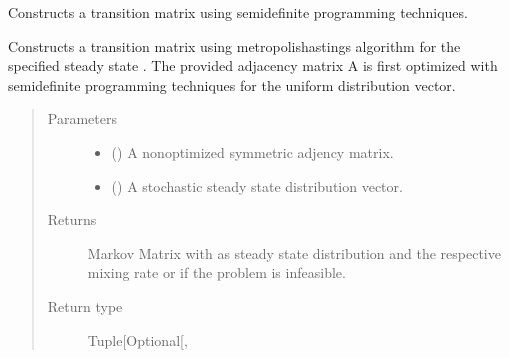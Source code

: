 \documentclass[letterpaper,10pt,english]{sphinxmanual}
\begin{document}

\begin{fulllineitems}
\label{\detokenize{app.domain.helpers:app.domain.helpers.matrices.new_sdp_mh_transition_matrix}}
Constructs a transition matrix using semi\sphinxhyphen{}definite programming techniques.

Constructs a transition matrix using metropolis\sphinxhyphen{}hastings algorithm  for
the specified steady state . The provided adjacency matrix A is first
optimized with semi\sphinxhyphen{}definite programming techniques for the uniform
distribution vector.
\begin{quote}\begin{description}
\item[{Parameters}] \leavevmode\begin{itemize}
\item {} 
 () \textendash{} A non\sphinxhyphen{}optimized symmetric adjency matrix.

\item {} 
 () \textendash{} A stochastic steady state distribution vector.

\end{itemize}

\item[{Returns}] \leavevmode
Markov Matrix with  as steady state distribution and the
respective mixing rate or  if the problem is
infeasible.

\item[{Return type}] \leavevmode
Tuple{[}Optional{[}\sphinxhref{https://numpy.org/doc/stable/reference/generated/numpy.ndarray.html\#numpy.ndarray}{numpy.ndarray}{]}, \sphinxhref{https://docs.python.org/3.7/library/functions.html\#float}{float}{]}

\end{description}\end{quote}

\end{fulllineitems}
\end{document}

